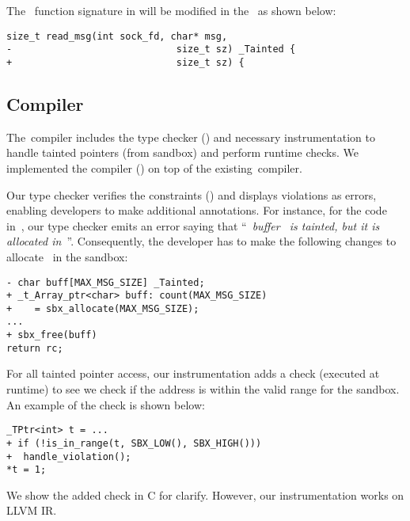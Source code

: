 The~ function signature in  will be modified in the ~\ucregion as shown below:
\begin{verbatim}
size_t read_msg(int sock_fd, char* msg,
-                             size_t sz) _Tainted {
+                             size_t sz) {
\end{verbatim}


\subsection{Compiler}
\label{subsec:compilerimple}
The~\systemname compiler includes the type checker () and necessary instrumentation to handle tainted pointers (\ie from sandbox) and perform runtime checks.
We implemented the compiler (\numcompilerlines{}) on top of the existing~\checkedc compiler.

Our type checker verifies the constraints () and displays violations as errors, enabling developers to make additional annotations.
For instance, for the code in~, our type checker emits an error saying that ``~\emph{buffer~ is tainted, but it is allocated in~\cregion}''.
Consequently, the developer has to make the following changes to allocate~ in the sandbox:
\begin{verbatim}
- char buff[MAX_MSG_SIZE] _Tainted;
+ _t_Array_ptr<char> buff: count(MAX_MSG_SIZE)
+    = sbx_allocate(MAX_MSG_SIZE);
...
+ sbx_free(buff)
return rc;
\end{verbatim}

For all tainted pointer access, our instrumentation adds a check (executed at runtime) to see we check if the address is within the valid range for the sandbox. An example of the check is shown below:
\begin{verbatim}
_TPtr<int> t = ...
+ if (!is_in_range(t, SBX_LOW(), SBX_HIGH()))
+  handle_violation();
*t = 1;
\end{verbatim}
We show the added check in C for clarify. However, our instrumentation works on LLVM IR.

